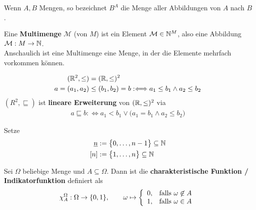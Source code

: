 \begin{notation}
    Wenn $A,B$ Mengen, so bezeichnet $B^A$ die Menge aller Abbildungen von $A$ nach $B$.
\end{notation}

\begin{definition}
	Eine \textbf{Multimenge} $\mathcal{M}$ (von $M$) ist ein Element $\mathcal{M}\in\mathbb{N}^M$, also eine Abbildung $\mathcal{M}:M\to\mathbb{N}$.\\
	Anschaulich ist eine Multimenge eine Menge, in der die Elemente mehrfach vorkommen können.
\end{definition}


\begin{beispiel}
	\begin{align*}
		(\mathbb{R}^2,\leq)&=(\mathbb{R},\leq)^2\\
		a=(a_1,a_2)&\leq(b_1,b_2)=b:\Longleftrightarrow a_1\leq b_1\wedge a_2\leq b_2
	\end{align*}
	$(R^2,\sqsubseteq)$ ist \textbf{lineare Erweiterung} von $(\mathbb{R},\leq)^2$ via 
	\begin{align*}
		a\sqsubseteq b:\Longleftrightarrow a_1<b_1\vee \big(a_1=b_1\wedge a_2\leq b_2\big)
	\end{align*}
	
\end{beispiel}

\begin{notation}
	Setze
	\begin{align*}
		\underline{n}&:=\big\lbrace 0,\ldots,n-1\big\rbrace\subseteq\mathbb{N}\\
		[n]&:=\big\lbrace1,\ldots,n\big\rbrace\subseteq\mathbb{N}
	\end{align*}
\end{notation}

\begin{definition}
	Sei $\Omega$ beliebige Menge und $A\subseteq\Omega$. 
	Dann ist die \textbf{charakteristische Funktion / Indikatorfunktion} definiert als
	\begin{align*}
		\chi_A^\Omega:\Omega\to\lbrace0,1\rbrace,\qquad\omega\mapsto\left\lbrace\begin{array}{cl}
			0, & \text{falls } \omega\not\in A\\
			1, &\text{falls }\omega\in A
		\end{array}\right.
	\end{align*}
\end{definition}

